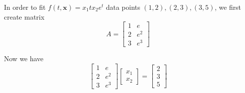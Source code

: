 \documentclass[11pt]{article}
\begin{document}
	In order to fit $f(t, \mathbf{x}) = x_1tx_2e^t$ data points $(1, 2), (2, 3), (3, 5)$, we first create matrix 
	\[A = 
	\begin{bmatrix}
		1 & e \\
		2 & e^2 \\
		3 & e^3
	\end{bmatrix} 
	\]
	
	Now we have
	\[
		\begin{bmatrix}
			1 & e \\
			2 & e^2 \\
			3 & e^3
		\end{bmatrix}
		\begin{bmatrix}
			x_1\\
			x_2
		\end{bmatrix} = 
		\begin{bmatrix}
			2\\
			3\\
			5
		\end{bmatrix}
	\]	
	
\end{document}

